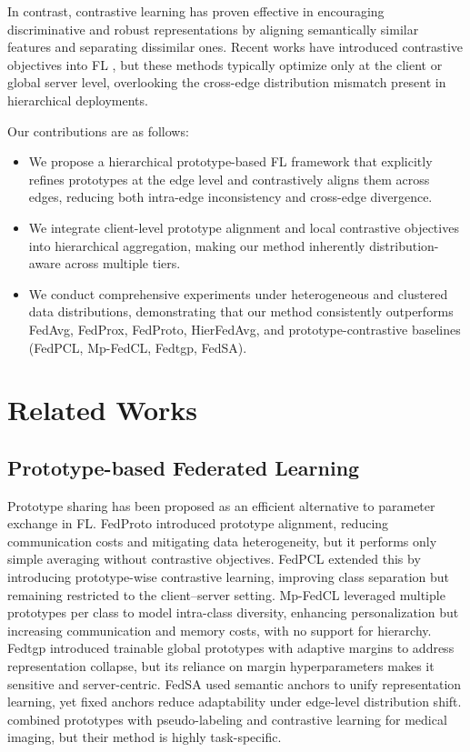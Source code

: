 \documentclass[twoside]{article}
\begin{document}
    In contrast, contrastive learning has proven effective in encouraging discriminative and robust representations by aligning semantically similar features and separating dissimilar ones. Recent works have introduced contrastive objectives into FL \cite{zhang2024fedtgp}, but these methods typically optimize only at the client or global server level, overlooking the cross-edge distribution mismatch present in hierarchical deployments.

    Our contributions are as follows:
    \begin{itemize}
        \item We propose a hierarchical prototype-based FL framework that explicitly refines prototypes at the edge level and contrastively aligns them across edges, reducing both intra-edge inconsistency and cross-edge divergence.
        \item We integrate client-level prototype alignment and local contrastive objectives into hierarchical aggregation, making our method inherently distribution-aware across multiple tiers.
        \item We conduct comprehensive experiments under heterogeneous and clustered data distributions, demonstrating that our method consistently outperforms FedAvg, FedProx, FedProto, HierFedAvg, and prototype-contrastive baselines (FedPCL, Mp-FedCL, Fedtgp, FedSA).
    \end{itemize}

\section{Related Works}
\label{sec:related_work}
    \subsection{Prototype-based Federated Learning}
        Prototype sharing has been proposed as an efficient alternative to parameter exchange in FL. FedProto \cite{tan2022fedproto} introduced prototype alignment, reducing communication costs and mitigating data heterogeneity, but it performs only simple averaging without contrastive objectives. FedPCL \cite{52355} extended this by introducing prototype-wise contrastive learning, improving class separation but remaining restricted to the client–server setting. Mp-FedCL \cite{qiao2023mp} leveraged multiple prototypes per class to model intra-class diversity, enhancing personalization but increasing communication and memory costs, with no support for hierarchy. Fedtgp \cite{zhang2024fedtgp} introduced trainable global prototypes with adaptive margins to address representation collapse, but its reliance on margin hyperparameters makes it sensitive and server-centric. FedSA \cite{zhou2025fedsa} used semantic anchors to unify representation learning, yet fixed anchors reduce adaptability under edge-level distribution shift. \cite{wu2023federated} combined prototypes with pseudo-labeling and contrastive learning for medical imaging, but their method is highly task-specific.
\end{document}
